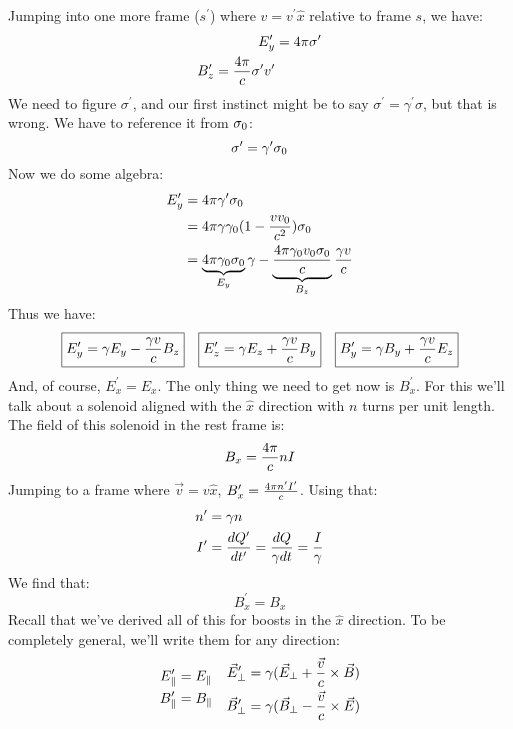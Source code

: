 \documentclass[11pt]{article}
\def\^{\hat}
\def\ef{\vec E}
\def\bfield{{\vec B}}
\begin{document}
Jumping into one more frame ($s^\prime$) where $v=v^\prime\^x$ relative to 
frame $s$, we have:
$$\begin{aligned}E_y^\prime&=4\pi\sigma^\prime\\ 
B_z^\prime={4\pi\over c}\sigma^\prime v^\prime\\ \end{aligned}$$
We need to figure $\sigma^\prime$, and our first instinct might be to say
$\sigma^\prime=\gamma^\prime\sigma$, but that is wrong.  We have to reference
it from $\sigma_0$:
$$\sigma^\prime=\gamma^\prime\sigma_0$$
Now we do some algebra:
\def\gamp{{\gamma^\prime}}
\def\gamo{{\gamma_0}}
$$\begin{aligned}E_y^\prime&=4\pi\gamp\sigo\\ 
&=4\pi\gamma\gamo(1-{vv_0\over c^2})\sigo\\ 
&=\underbrace{4\pi\gamo\sigo}_{E_y}\gamma-\underbrace{4\pi\gamo v_0\sigo\over
c}_{B_z}{\gamma v\over c}\\ \end{aligned}$$
Thus we have:
$$\begin{matrix}
\boxed{E_y^\prime=\gamma E_y-{\gamma v\over c}B_z}&
\boxed{E_z^\prime=\gamma E_z+{\gamma v\over c}B_y}&
\boxed{B_y^\prime=\gamma B_y+{\gamma v\over c}E_z}
\end{matrix}$$
And, of course, $E_x^\prime=E_x$.  The only thing we need to get now is
$B_x^\prime$.  For this we'll talk about a solenoid aligned with the $\^x$
direction with $n$ turns per unit length.  The field of this solenoid
in the rest frame is:
$$B_x={4\pi\over c}nI$$
Jumping to a frame where $\vec v=v\^x$, $B_x^\prime={4\pi n^\prime I^\prime\over
c}$. Using that:
$$\begin{aligned}n^\prime&=\gamma n\\ 
I^\prime&={dQ^\prime\over dt^\prime}={dQ\over\gamma dt}={I\over\gamma}\\ \end{aligned}$$
We find that:
$$\boxed{B_x^\prime=B_x}$$
Recall that we've derived all of this for boosts in the $\^x$ direction.
To be completely general, we'll write them for any direction:
$$\begin{matrix}\begin{aligned}E_\|^\prime&=E_\|\\ 
B_\|^\prime&=B_\|\\ \end{aligned}&
\begin{aligned}\vec E_\perp^\prime
&=\gamma(\ef_\perp+{\vec v\over c}\times\bfield)\\ 
\vec B_\perp^\prime&=\gamma(\bfield_\perp-{\vec v\over c}\times\ef)\\ 
\end{aligned}
\end{matrix}$$
\end{document}
